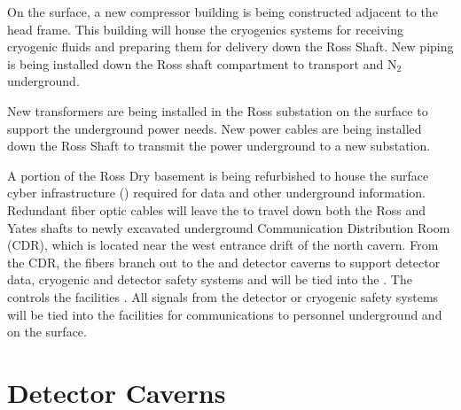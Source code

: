 On the surface, a new compressor building is being constructed
adjacent to the head frame.  This building will house the cryogenics
systems for receiving cryogenic fluids and preparing them for delivery
down the Ross Shaft.  New piping is being installed down the Ross
shaft compartment to transport  and N$_2$ underground.

New transformers are being installed in the Ross substation on the
surface to support the underground power needs.  New power cables are
being installed down the Ross Shaft to transmit the power underground
to a new substation.

A portion of the Ross Dry basement is being refurbished to house the
surface cyber infrastructure () required for data and other
underground information.  Redundant fiber optic cables will leave the
 to travel down both the Ross and Yates shafts to newly
excavated underground Communication Distribution Room (CDR), which is
located near the west entrance drift of the north cavern.  From the
CDR, the fibers branch out to the  and detector caverns to
support detector data, cryogenic and detector safety systems and will
be tied into the .  The  controls the facilities
.  All  signals from the detector or cryogenic
safety systems will be tied into the facilities  for
communications to personnel underground and on the surface.

\section{Detector Caverns}
\label{sec:fdsp-coord-faci-caverns}


